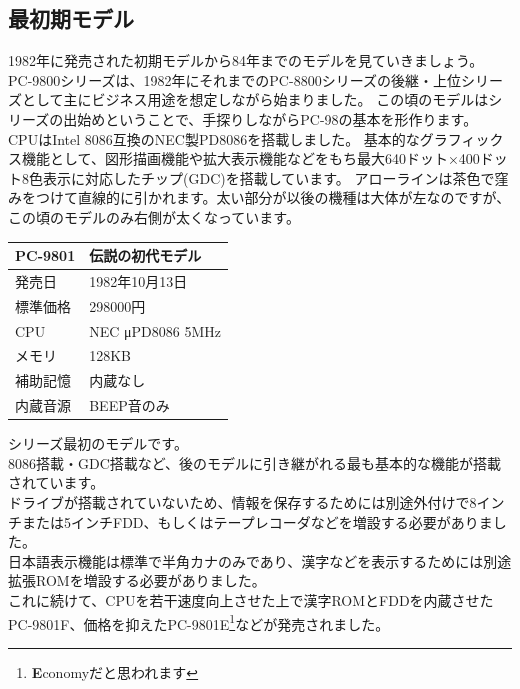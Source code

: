 \documentclass[b5paper,9pt,platex,dvipdfmx]{jsarticle}
\begin{document}
\begin{multicols}{3}
\subsection{最初期モデル}
1982年に発売された初期モデルから84年までのモデルを見ていきましょう。
PC-9800シリーズは、1982年にそれまでのPC-8800シリーズの後継・上位シリーズとして主にビジネス用途を想定しながら始まりました。
この頃のモデルはシリーズの出始めということで、手探りしながらPC-98の基本を形作ります。
CPUはIntel 8086互換のNEC製PD8086を搭載しました。
基本的なグラフィックス機能として、図形描画機能や拡大表示機能などをもち最大640ドット×400ドット8色表示に対応したチップ(GDC)を搭載しています。
アローラインは茶色で窪みをつけて直線的に引かれます。太い部分が以後の機種は大体が左なのですが、この頃のモデルのみ右側が太くなっています。
\begin{table}[H]
  \centering
    \begin{tabular}{ll}
        {\bf PC-9801} & 伝説の初代モデル\\ \hline
        発売日 & 1982年10月13日\\
        標準価格 & 298000円\\
        CPU & NEC μPD8086 5MHz\\
        メモリ & 128KB\\
        補助記憶 & 内蔵なし\\
        内蔵音源 & BEEP音のみ\\
        \end{tabular}
\end{table}
シリーズ最初のモデルです。\\
8086搭載・GDC搭載など、後のモデルに引き継がれる最も基本的な機能が搭載されています。\\
ドライブが搭載されていないため、情報を保存するためには別途外付けで8インチまたは5インチFDD、もしくはテープレコーダなどを増設する必要がありました。\\
日本語表示機能は標準で半角カナのみであり、漢字などを表示するためには別途拡張ROMを増設する必要がありました。\\
これに続けて、CPUを若干速度向上させた上で漢字ROMとFDDを内蔵させたPC-9801F、価格を抑えたPC-9801E\footnote{{\bf E}conomyだと思われます}などが発売されました。\\

\end{multicols}
\end{document}
